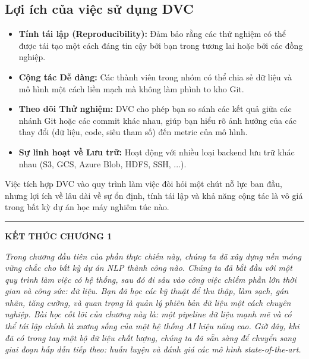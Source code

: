 \subsection{Lợi ích của việc sử dụng DVC}
\begin{itemize}
    \item \textbf{Tính tái lập (Reproducibility):} Đảm bảo rằng các thử nghiệm có thể được tái tạo một cách đáng tin cậy bởi bạn trong tương lai hoặc bởi các đồng nghiệp.
    \item \textbf{Cộng tác Dễ dàng:} Các thành viên trong nhóm có thể chia sẻ dữ liệu và mô hình một cách liền mạch mà không làm phình to kho Git.
    \item \textbf{Theo dõi Thử nghiệm:} DVC cho phép bạn so sánh các kết quả giữa các nhánh Git hoặc các commit khác nhau, giúp bạn hiểu rõ ảnh hưởng của các thay đổi (dữ liệu, code, siêu tham số) đến metric của mô hình.
    \item \textbf{Sự linh hoạt về Lưu trữ:} Hoạt động với nhiều loại backend lưu trữ khác nhau (S3, GCS, Azure Blob, HDFS, SSH, ...).
\end{itemize}
Việc tích hợp DVC vào quy trình làm việc đòi hỏi một chút nỗ lực ban đầu, nhưng lợi ích về lâu dài về sự ổn định, tính tái lập và khả năng cộng tác là vô giá trong bất kỳ dự án học máy nghiêm túc nào.

\bigskip
\hrule
\bigskip

\begin{center}
    \textbf{\Large KẾT THÚC CHƯƠNG 1}
\end{center}

\textit{Trong chương đầu tiên của phần thực chiến này, chúng ta đã xây dựng nền móng vững chắc cho bất kỳ dự án NLP thành công nào. Chúng ta đã bắt đầu với một quy trình làm việc có hệ thống, sau đó đi sâu vào công việc chiếm phần lớn thời gian và công sức: dữ liệu. Bạn đã học các kỹ thuật để thu thập, làm sạch, gán nhãn, tăng cường, và quan trọng là quản lý phiên bản dữ liệu một cách chuyên nghiệp. Bài học cốt lõi của chương này là: một pipeline dữ liệu mạnh mẽ và có thể tái lập chính là xương sống của một hệ thống AI hiệu năng cao. Giờ đây, khi đã có trong tay một bộ dữ liệu chất lượng, chúng ta đã sẵn sàng để chuyển sang giai đoạn hấp dẫn tiếp theo: huấn luyện và đánh giá các mô hình state-of-the-art.}
